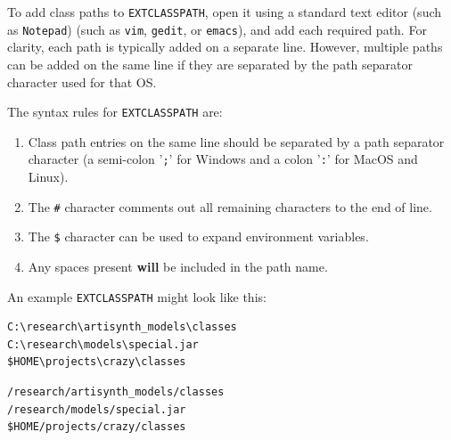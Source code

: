 To add class paths to {\tt EXTCLASSPATH}, open it using a
standard text editor
\ifWindows
(such as {\tt Notepad})
\else
(such as {\tt vim}, {\tt gedit}, or {\tt emacs}),
\fi
and add each required path. For clarity, each path is typically
added on a separate line. However, multiple paths can be
added on the same line if they are separated by the
path separator character used for that OS.

The syntax rules for {\tt EXTCLASSPATH} are:

\begin{enumerate}

\item Class path entries on the same line should be separated by a
path separator character (a semi-colon '{\tt ;}' for Windows
and a colon '{\tt :}' for MacOS and Linux).

\item The {\tt \#} character comments out all remaining characters
to the end of line.

\item The {\tt \$} character can be used to expand environment variables.

\item Any spaces present {\bf will} be included in the path name.

\end{enumerate}

An example {\tt EXTCLASSPATH} might look like this:

\ifWindows
\begin{verbatim}
C:\research\artisynth_models\classes
C:\research\models\special.jar
$HOME\projects\crazy\classes
\end{verbatim}
\else
\begin{verbatim}
/research/artisynth_models/classes
/research/models/special.jar
$HOME/projects/crazy/classes
\end{verbatim}
\fi



